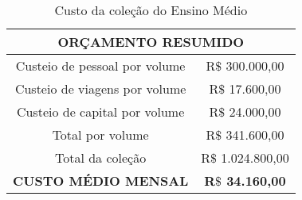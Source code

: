 \documentclass[10 pt]{article}
\begin{document}
 

 \begin{table}[h!]\label{tab orcamento}
  \begin{center}
   \begin{tabular}{|c|c|}
   \hline
   \multicolumn{2}{|c|}{{\bf ORÇAMENTO RESUMIDO}} \\
   \hline   
   Custeio de pessoal por volume &  R$\$$ 300.000,00 \\
   \hline
   Custeio de viagens por volume &  R$\$$ 17.600,00 \\
   \hline
   Custeio de capital por volume &  R$\$$ 24.000,00 \\
   \hline
    Total por volume &  R$\$$ 341.600,00\\
   \hline
    Total da coleção & R$\$$ 1.024.800,00\\
   \hline
   {\bf CUSTO MÉDIO MENSAL}&{\bf R$\$$ 34.160,00}\\
   \hline
   \end{tabular}
  \end{center}
  \caption{Custo da coleção do Ensino Médio}
 \end{table}



 
\end{document}
